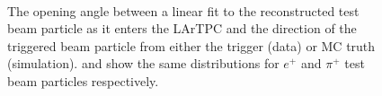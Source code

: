 \begin{figure}
\centering
{} \\
\caption{\protect{} The opening angle between a linear fit to the reconstructed test beam particle as it enters the LArTPC and the direction of the triggered beam particle from either the trigger (data) or MC truth (simulation).  \protect{} and \protect{} show the same distributions for $e^{+}$ and $\pi^{+}$ test beam particles respectively.}
\label{fig:openingangles}
\end{figure}

